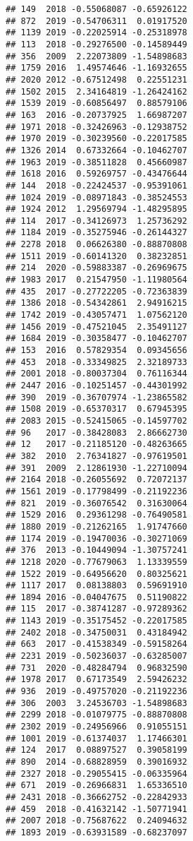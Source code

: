\documentclass[
]{article}
\begin{document}
\begin{verbatim}
## 149  2018 -0.55068087 -0.65926122
## 872  2019 -0.54706311  0.01917520
## 1139 2019 -0.22025914 -0.25318978
## 113  2018 -0.29276500 -0.14589449
## 356  2009  2.22073809 -1.54898683
## 1759 2016  1.49574646 -1.16932655
## 2020 2012 -0.67512498  0.22551231
## 1502 2015  2.34164819 -1.26424162
## 1539 2019 -0.60856497  0.88579106
## 163  2016 -0.20737925  1.66987207
## 1971 2018 -0.32426963 -0.12938752
## 1970 2019 -0.30239560 -0.22017585
## 1326 2014  0.67332664 -0.10462707
## 1963 2019 -0.38511828  0.45660987
## 1618 2016  0.59269757 -0.43476644
## 144  2018 -0.22424537 -0.95391061
## 1024 2019 -0.08971843 -0.38524553
## 1924 2012  1.29569794 -1.48295895
## 114  2017 -0.34126973  1.25736292
## 1184 2019 -0.35275946 -0.26144327
## 2278 2018  0.06626380 -0.88870808
## 1511 2019 -0.60141320  0.38232851
## 214  2020 -0.59883387 -0.26969675
## 1983 2017  0.21547950 -1.11980564
## 435  2017 -0.27722205 -0.72363839
## 1386 2018 -0.54342861  2.94916215
## 1742 2019 -0.43057471  1.07562120
## 1456 2019 -0.47521045  2.35491127
## 1684 2019 -0.30358477 -0.10462707
## 153  2016  0.57829354  0.09345656
## 453  2018 -0.33349825  2.32189733
## 2001 2018 -0.80037304  0.76116344
## 2447 2016 -0.10251457 -0.44301992
## 390  2019 -0.36707974 -1.23865582
## 1508 2019 -0.65370317  0.67945395
## 2083 2015 -0.52415065 -0.14597702
## 96   2017 -0.38428083  2.86662730
## 12   2017 -0.21185120 -0.48263665
## 382  2010  2.76341827 -0.97619501
## 391  2009  2.12861930 -1.22710094
## 2164 2018 -0.26055692  0.72072137
## 1561 2019 -0.17798499 -0.21192236
## 821  2019 -0.36076542  0.31630064
## 1529 2016  0.29361298 -0.76490581
## 1880 2019 -0.21262165  1.91747660
## 1174 2019 -0.19470036 -0.30271069
## 376  2013 -0.10449094 -1.30757241
## 1218 2020 -0.77679063  1.13339559
## 1522 2019 -0.64956620  0.80325621
## 1117 2017  0.08138803  0.59691910
## 1894 2016 -0.04047675  0.51190822
## 115  2017 -0.38741287 -0.97289362
## 1143 2019 -0.35175452 -0.22017585
## 2402 2018 -0.34750031  0.43184942
## 663  2017 -0.41538349 -0.59158264
## 2231 2019 -0.50236037 -0.63285007
## 731  2020 -0.48284794  0.96832590
## 1978 2017  0.67173549  2.59426232
## 936  2019 -0.49757020 -0.21192236
## 306  2003  3.24536703 -1.54898683
## 2299 2018 -0.01079775 -0.88870808
## 2302 2019 -0.24956966  0.91055151
## 1001 2019 -0.61374037  1.17466301
## 124  2017  0.08897527  0.39058199
## 890  2014 -0.68828959  0.39016932
## 2327 2018 -0.29055415 -0.06335964
## 671  2019 -0.26966831  1.65336510
## 2431 2018 -0.36662752 -0.22842933
## 459  2018 -0.41632142 -1.50771941
## 2007 2018 -0.75687622  0.24094632
## 1893 2019 -0.63931589 -0.68237097

\end{verbatim}
\end{document}
